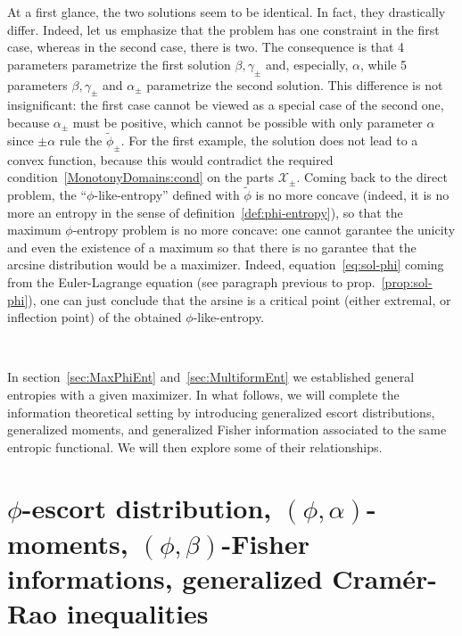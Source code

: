 \documentclass[entropy,article,submit,moreauthors,pdftex]{Definitions/mdpi}
\def\X{\mathcal{X}}%
\begin{document}
{At  a first  glance, the  two solutions  seem to  be identical.   In fact,  they
drastically  differ.   Indeed,  let  us  emphasize  that  the  problem  has  one
constraint in  the first case,  whereas in the second  case, there is  two.  The
consequence  is  that  4  parameters  parametrize  the  first  solution  $\beta,
\gamma_\pm$ and,  especially, $\alpha$,  while 5 parameters  $\beta, \gamma_\pm$
and  $\alpha_\pm$  parametrize the  second  solution.   This difference  is  not
insignificant: the first case  cannot be viewed as a special  case of the second
one, because $\alpha_\pm$  must be positive, which cannot be  possible with only
parameter $\alpha$ since  $\pm \alpha$ rule the  $\widetilde{\phi}_\pm$. For the
first example,  the solution does  not lead to  a convex function,  because this
would contradict the required  condition~\ref{MonotonyDomains:cond} on the parts
$\X_\pm$. Coming back to the direct problem, the ``$\phi$-like-entropy'' defined
with $\widetilde{\phi}$ is no more concave (indeed,  it is no more an entropy in
the   sense   of   definition~\ref{def:phi-entropy}),  so   that   the   maximum
$\phi$-entropy problem is  no more concave: one cannot garantee  the unicity and
even the existence  of a maximum so  that there is no garantee  that the arcsine
distribution would  be a  maximizer. Indeed,  equation~\eqref{eq:sol-phi} coming
from    the    Euler-Lagrange    equation    (see    paragraph    previous    to
prop.~\ref{prop:sol-phi}), one can  just conclude that the arsine  is a critical
point    (either   extremal,    or   inflection    point)   of    the   obtained
$\phi$-like-entropy.}

\

In section~\ref{sec:MaxPhiEnt} and~\ref{sec:MultiformEnt} we established general
entropies  with a  given  maximizer.   In what  follows,  we  will complete  the
information theoretical setting by introducing generalized escort distributions,
generalized moments, and  generalized Fisher information associated  to the same
entropic functional. We will then explore some of their relationships.




\section{$\phi$-escort           distribution,          $(\phi,\alpha)$-moments,
  $(\phi,\beta)$-Fisher informations,  generalized Cram\'er-Rao inequalities}
\label{sec:EscortCR}
\end{document}
